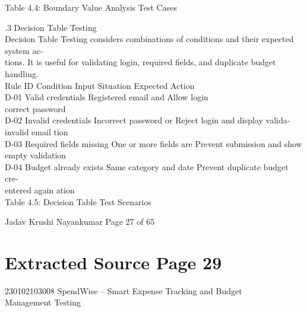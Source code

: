 \documentclass[12pt,a4paper]{report}
\begin{document}
\smallskip
Table 4.4: Boundary Value Analysis Test Cases\\ 

\smallskip

\smallskip

.3 Decision Table Testing\\ 

\smallskip
Decision Table Testing considers combinations of conditions and their expected system ac-\\ 
tions. It is useful for validating login, required fields, and duplicate budget handling.\\ 

\smallskip
Rule ID Condition                        Input Situation           Expected Action\\ 
D-01       Valid credentials             Registered email and Allow login\\ 
correct password\\ 
D-02       Invalid credentials           Incorrect password or Reject login and display valida-\\ 
invalid email             tion\\ 
D-03       Required fields missing One or more fields are Prevent submission and show\\ 
empty                     validation\\ 
D-04       Budget already exists         Same category and date Prevent duplicate budget cre-\\ 
entered again             ation\\ 

\smallskip
Table 4.5: Decision Table Test Scenarios\\ 

\smallskip

\smallskip

\smallskip

\smallskip
Jadav Krushi Nayankumar                                                                Page 27 of 65\\ 

\clearpage
\section*{Extracted Source Page 29}
230102103008                          SpendWise – Smart Expense Tracking and Budget\\ 
Management Testing\\ 
\end{document}
